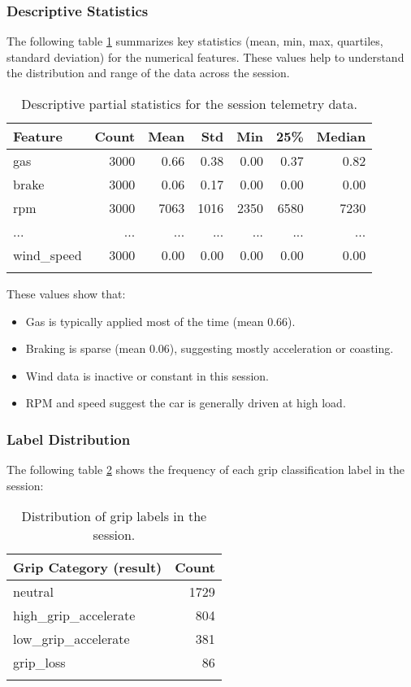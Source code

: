 \documentclass[a4paper,final,12pt]{report}
\begin{document}
\subsubsection{Descriptive Statistics}
The following table \ref{tab:stat_tab} summarizes key statistics (mean, min, max, quartiles, standard deviation) for the numerical features. These values help to understand the distribution and range of the data across the session.

\begin{longtable}{|l|r|r|r|r|r|r|}
\hline
\textbf{Feature} & \textbf{Count} & \textbf{Mean} & \textbf{Std} & \textbf{Min} & \textbf{25\%} & \textbf{Median} \\
\hline
gas & 3000 & 0.66 & 0.38 & 0.00 & 0.37 & 0.82 \\
brake & 3000 & 0.06 & 0.17 & 0.00 & 0.00 & 0.00 \\
rpm & 3000 & 7063 & 1016 & 2350 & 6580 & 7230 \\
... & ... & ... & ... & ... & ... & ... \\
wind\_speed & 3000 & 0.00 & 0.00 & 0.00 & 0.00 & 0.00 \\
\hline
\caption{Descriptive partial statistics for the session telemetry data.}
\label{tab:stat_tab}
\end{longtable}

These values show that:
\begin{itemize}
    \item Gas is typically applied most of the time (mean 0.66).
    \item Braking is sparse (mean 0.06), suggesting mostly acceleration or coasting.
    \item Wind data is inactive or constant in this session.
    \item RPM and speed suggest the car is generally driven at high load.
\end{itemize}

\subsubsection{Label Distribution}
The following table \ref{tab:lab_distr} shows the frequency of each grip classification label in the session:

\begin{longtable}{|l|r|}
\hline
\textbf{Grip Category (result)} & \textbf{Count} \\
\hline
neutral & 1729 \\
high\_grip\_accelerate & 804 \\
low\_grip\_accelerate & 381 \\
grip\_loss & 86 \\
\hline
\caption{Distribution of grip labels in the session.}
\label{tab:lab_distr}
\end{longtable}
\end{document}
